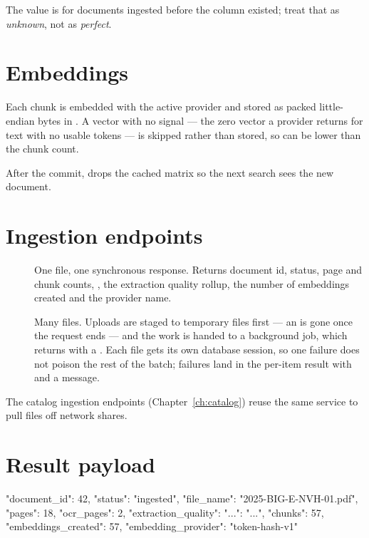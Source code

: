 The value is  for documents ingested before the column existed; treat
that as \emph{unknown}, not as \emph{perfect}.

\section{Embeddings}

Each chunk is embedded with the active provider and stored as packed
little-endian  bytes in . A vector with no
signal --- the zero vector a  provider returns for text with no
usable tokens --- is skipped rather than stored, so 
can be lower than the chunk count.

After the commit,  drops the cached matrix so
the next search sees the new document.

\section{Ingestion endpoints}

\begin{description}
\item[] One file, one synchronous response. Returns document
id, status, page and chunk counts, , the extraction quality
rollup, the number of embeddings created and the provider name.

\item[] Many files. Uploads are staged to temporary
files first --- an  is gone once the request ends --- and the
work is handed to a background job, which returns  with a
. Each file gets its own database session, so one failure does not
poison the rest of the batch; failures land in the per-item result with
 and a message.
\end{description}

The catalog ingestion endpoints (Chapter~\ref{ch:catalog}) reuse the same
service to pull files off network shares.

\section{Result payload}

\begin{jsonblock}
{
  "document_id": 42,
  "status": "ingested",
  "file_name": "2025-BIG-E-NVH-01.pdf",
  "pages": 18,
  "ocr_pages": 2,
  "extraction_quality": {"...": "..."},
  "chunks": 57,
  "embeddings_created": 57,
  "embedding_provider": "token-hash-v1"
}
\end{jsonblock}
